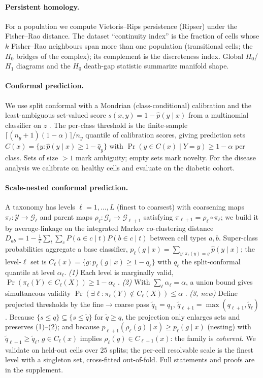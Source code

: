 \documentclass[11pt]{article}
\begin{document}
\paragraph{Persistent homology.} For a population we compute Vietoris--Rips persistence (Ripser) under
the Fisher--Rao distance. The dataset ``continuity index'' is the fraction of cells whose $k$
Fisher--Rao neighbours span more than one population (transitional cells; the $H_0$ bridges of the
complex); its complement is the discreteness index. Global $H_0$/$H_1$ diagrams and the $H_0$ death-gap
statistic summarize manifold shape.

\paragraph{Conformal prediction.} We use split conformal with a Mondrian (class-conditional) calibration
and the least-ambiguous set-valued score $s(x,y)=1-\hat p(y\mid x)$ from a multinomial classifier on
$z$ \citep{sadinle2019least,angelopoulos2023gentle}. The per-class threshold is the finite-sample
$\lceil(n_y+1)(1-\alpha)\rceil/n_y$ quantile of calibration scores, giving prediction sets
$C(x)=\{y:\hat p(y\mid x)\ge 1-\hat q_y\}$ with $\Pr(y\in C(x)\mid Y=y)\ge 1-\alpha$ per class. Sets of
size $>1$ mark ambiguity; empty sets mark novelty. For the disease analysis we calibrate on healthy
cells and evaluate on the diabetic cohort.

\paragraph{Scale-nested conformal prediction.} A taxonomy has levels $\ell=1,\dots,L$ (finest to
coarsest) with coarsening maps $\pi_\ell:\mathcal Y\to\mathcal G_\ell$ and parent maps
$\rho_\ell:\mathcal G_\ell\to\mathcal G_{\ell+1}$ satisfying $\pi_{\ell+1}=\rho_\ell\circ\pi_\ell$;
we build it by average-linkage on the integrated Markov co-clustering distance
$D_{ab}=1-\frac1T\sum_t\sum_c P(a\in c\mid t)P(b\in c\mid t)$ between cell types $a,b$. Super-class
probabilities aggregate a base classifier, $p_\ell(g\mid x)=\sum_{y:\pi_\ell(y)=g}\hat p(y\mid x)$;
the level-$\ell$ set is $C_\ell(x)=\{g:p_\ell(g\mid x)\ge 1-q_\ell\}$ with $q_\ell$ the split-conformal
quantile at level $\alpha_\ell$. \emph{(1)} Each level is marginally valid,
$\Pr(\pi_\ell(Y)\in C_\ell(X))\ge1-\alpha_\ell$ \citep{vovk2005algorithmic}. \emph{(2)} With
$\sum_\ell\alpha_\ell=\alpha$, a union bound gives simultaneous validity
$\Pr(\exists\ell:\pi_\ell(Y)\notin C_\ell(X))\le\alpha$ \citep{baheri2025multiscale}. \emph{(3, new)}
Define projected thresholds by the fine$\to$coarse pass $\tilde q_1=q_1$,
$\tilde q_{\ell+1}=\max(q_{\ell+1},\tilde q_\ell)$. Because $\{s\le q\}\subseteq\{s\le\tilde q\}$ for
$\tilde q\ge q$, the projection only enlarges sets and preserves (1)--(2); and because
$p_{\ell+1}(\rho_\ell(g)\mid x)\ge p_\ell(g\mid x)$ (nesting) with $\tilde q_{\ell+1}\ge\tilde q_\ell$,
$g\in C_\ell(x)$ implies $\rho_\ell(g)\in C_{\ell+1}(x)$: the family is \emph{coherent}. We validate on
held-out cells over $25$ splits; the per-cell resolvable scale is the finest level with a singleton
set, cross-fitted out-of-fold. Full statements and proofs are in the supplement.
\end{document}
